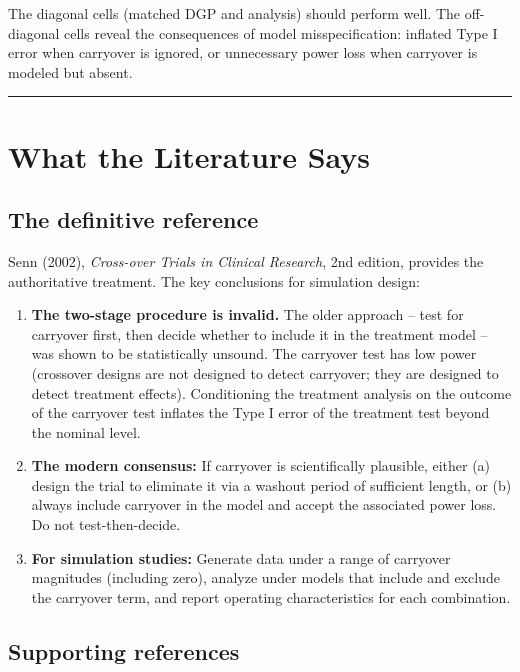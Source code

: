 \documentclass[11pt]{article}
\begin{document}
The diagonal cells (matched DGP and analysis) should perform
well. The off-diagonal cells reveal the consequences of model
misspecification: inflated Type I error when carryover is ignored,
or unnecessary power loss when carryover is modeled but absent.

\bigskip\noindent\rule{\textwidth}{0.4pt}\bigskip

\section{What the Literature Says}

\subsection{The definitive reference}

Senn (2002), \textit{Cross-over Trials in Clinical Research}, 2nd
edition, provides the authoritative treatment. The key conclusions
for simulation design:

\begin{enumerate}
  \item \textbf{The two-stage procedure is invalid.} The older approach --
    test for carryover first, then decide whether to include it
    in the treatment model -- was shown to be statistically
    unsound. The carryover test has low power (crossover designs
    are not designed to detect carryover; they are designed to
    detect treatment effects). Conditioning the treatment analysis
    on the outcome of the carryover test inflates the Type I error
    of the treatment test beyond the nominal level.

  \item \textbf{The modern consensus:} If carryover is scientifically
    plausible, either (a) design the trial to eliminate it via a
    washout period of sufficient length, or (b) always include
    carryover in the model and accept the associated power loss.
    Do not test-then-decide.

  \item \textbf{For simulation studies:} Generate data under a range of
    carryover magnitudes (including zero), analyze under models
    that include and exclude the carryover term, and report
    operating characteristics for each combination.
\end{enumerate}

\subsection{Supporting references}
\end{document}
